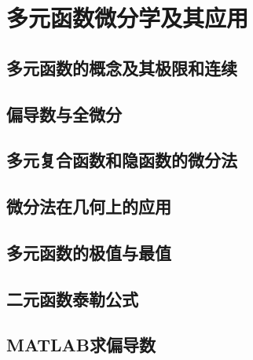 \chapter{多元函数微分学及其应用}\label{cha:8}

\section{多元函数的概念及其极限和连续}

\section{偏导数与全微分}

\section{多元复合函数和隐函数的微分法}

\section{微分法在几何上的应用}

\section{多元函数的极值与最值}

\section{二元函数泰勒公式}

\section{MATLAB求偏导数}